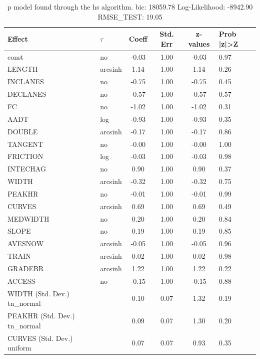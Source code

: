 \begin{table}
	\caption{p model found through the hs algorithm. bic: 18059.78 Log-Likelihood: -8942.90 RMSE_TEST: 19.05}
	\begin{center}
		\begin{tabular}{|l|l|c|c|c|l|}
			\hline
			Effect & $\tau$ & Coeff & Std. Err & z-values & Prob |z|>Z \\
			\hline
			const & no & -0.03 & 1.00 & -0.03 & 0.97 \\
			\hline
			LENGTH & arcsinh & 1.14 & 1.00 & 1.14 & 0.26 \\
			\hline
			INCLANES & no & -0.75 & 1.00 & -0.75 & 0.45 \\
			\hline
			DECLANES & no & -0.57 & 1.00 & -0.57 & 0.57 \\
			\hline
			FC & no & -1.02 & 1.00 & -1.02 & 0.31 \\
			\hline
			AADT & log & -0.93 & 1.00 & -0.93 & 0.35 \\
			\hline
			DOUBLE & arcsinh & -0.17 & 1.00 & -0.17 & 0.86 \\
			\hline
			TANGENT & no & -0.00 & 1.00 & -0.00 & 1.00 \\
			\hline
			FRICTION & log & -0.03 & 1.00 & -0.03 & 0.98 \\
			\hline
			INTECHAG & no & 0.90 & 1.00 & 0.90 & 0.37 \\
			\hline
			WIDTH & arcsinh & -0.32 & 1.00 & -0.32 & 0.75 \\
			\hline
			PEAKHR & no & -0.01 & 1.00 & -0.01 & 0.99 \\
			\hline
			CURVES & arcsinh & 0.69 & 1.00 & 0.69 & 0.49 \\
			\hline
			MEDWIDTH & no & 0.20 & 1.00 & 0.20 & 0.84 \\
			\hline
			SLOPE & no & 0.19 & 1.00 & 0.19 & 0.85 \\
			\hline
			AVESNOW & arcsinh & -0.05 & 1.00 & -0.05 & 0.96 \\
			\hline
			TRAIN & arcsinh & 0.02 & 1.00 & 0.02 & 0.98 \\
			\hline
			GRADEBR & arcsinh & 1.22 & 1.00 & 1.22 & 0.22 \\
			\hline
			ACCESS & no & -0.15 & 1.00 & -0.15 & 0.88 \\
			\hline
			WIDTH (Std. Dev.) tn_normal &  & 0.10 & 0.07 & 1.32 & 0.19 \\
			\hline
			PEAKHR (Std. Dev.) tn_normal &  & 0.09 & 0.07 & 1.30 & 0.20 \\
			\hline
			CURVES (Std. Dev.) uniform &  & 0.07 & 0.07 & 0.93 & 0.35 \\

\end{tabular}
\end{center}
\end{table}
